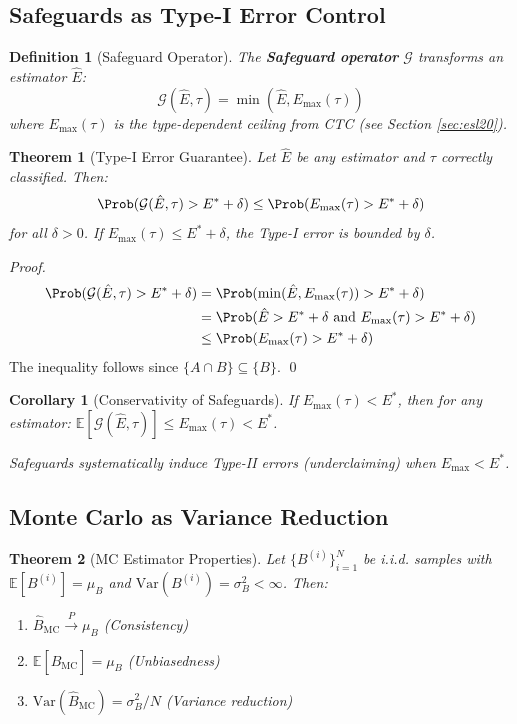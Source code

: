 \documentclass[11pt,a4paper]{article}
\newtheorem{definition}{Definition}[section]
\newtheorem{theorem}{Theorem}[section]
\newtheorem{corollary}{Corollary}[theorem]
\begin{document}
\subsection{Safeguards as Type-I Error Control}

\begin{definition}[Safeguard Operator]
The \textbf{Safeguard operator} $\mathcal{G}$ transforms an estimator $\hat{E}$:
\[
\mathcal{G}(\hat{E}, \tau) = \min(\hat{E}, E_{\max}(\tau))
\]
where $E_{\max}(\tau)$ is the type-dependent ceiling from CTC (see Section \ref{sec:esl20}).
\end{definition}

\begin{theorem}[Type-I Error Guarantee]
\label{thm:type1-guarantee-app}
Let $\hat{E}$ be any estimator and $\tau$ correctly classified. Then:
\[
\Prob(\mathcal{G}(\hat{E}, \tau) > E^* + \delta) \leq \Prob(E_{\max}(\tau) > E^* + \delta)
\]
for all $\delta > 0$. If $E_{\max}(\tau) \leq E^* + \delta$, the Type-I error is bounded by $\delta$.
\end{theorem}

\begin{proof}
\begin{align*}
\Prob(\mathcal{G}(\hat{E}, \tau) > E^* + \delta) &= \Prob(\min(\hat{E}, E_{\max}(\tau)) > E^* + \delta) \\
&= \Prob(\hat{E} > E^* + \delta \text{ and } E_{\max}(\tau) > E^* + \delta) \\
&\leq \Prob(E_{\max}(\tau) > E^* + \delta)
\end{align*}
The inequality follows since $\{A \cap B\} \subseteq \{B\}$. \qed
\end{proof}

\begin{corollary}[Conservativity of Safeguards]
If $E_{\max}(\tau) < E^*$, then for any estimator: $\mathbb{E}[\mathcal{G}(\hat{E}, \tau)] \leq E_{\max}(\tau) < E^*$.

Safeguards systematically induce Type-II errors (underclaiming) when $E_{\max} < E^*$.
\end{corollary}

\subsection{Monte Carlo as Variance Reduction}

\begin{theorem}[MC Estimator Properties]
\label{thm:mc-properties-app}
Let $\{B^{(i)}\}_{i=1}^N$ be i.i.d. samples with $\mathbb{E}[B^{(i)}] = \mu_B$ and $\mathrm{Var}(B^{(i)}) = \sigma_B^2 < \infty$. Then:
\begin{enumerate}
    \item $\hat{B}_{\mathrm{MC}} \xrightarrow{P} \mu_B$ (Consistency)
    \item $\mathbb{E}[\hat{B}_{\mathrm{MC}}] = \mu_B$ (Unbiasedness)
    \item $\mathrm{Var}(\hat{B}_{\mathrm{MC}}) = \sigma_B^2 / N$ (Variance reduction)
\end{enumerate}
\end{theorem}
\end{document}
